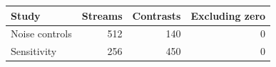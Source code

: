 \begin{tabular*}{\columnwidth}{@{\extracolsep{\fill}}lrrr@{}}\toprule
Study & Streams & Contrasts & Excluding zero \\ \midrule
Noise controls & 512 & 140 & 0 \\
Sensitivity & 256 & 450 & 0 \\
\bottomrule\end{tabular*}
